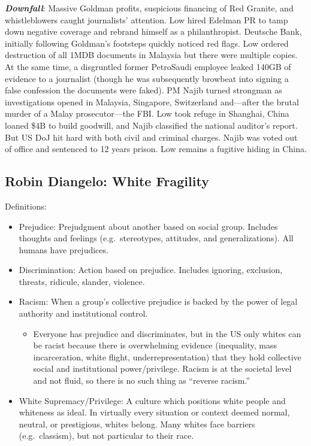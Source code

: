 \documentclass[
]{article}
\providecommand{\tightlist}{%
  \setlength{\itemsep}{0pt}\setlength{\parskip}{0pt}}
\begin{document}
\textbf{\emph{Downfall}}: Massive Goldman profits, suspicious financing
of Red Granite, and whistleblowers caught journalists' attention. Low
hired Edelman PR to tamp down negative coverage and rebrand himself as a
philanthropist. Deutsche Bank, initially following Goldman's footsteps
quickly noticed red flags. Low ordered destruction of all 1MDB documents
in Malaysia but there were multiple copies. At the same time, a
disgruntled former PetroSaudi employee leaked 140GB of evidence to a
journalist (though he was subsequently browbeat into signing a false
confession the documents were faked). PM Najib turned strongman as
investigations opened in Malaysia, Singapore, Switzerland and---after
the brutal murder of a Malay prosecutor---the FBI. Low took refuge in
Shanghai, China loaned \$4B to build goodwill, and Najib classified the
national auditor's report. But US DoJ hit hard with both civil and
criminal charges. Najib was voted out of office and sentenced to 12
years prison. Low remains a fugitive hiding in China.

\hypertarget{robin-diangelo-white-fragility}{%
\subsection{Robin Diangelo: White
Fragility}\label{robin-diangelo-white-fragility}}

Definitions:

\begin{itemize}
\item
  Prejudice: Prejudgment about another based on social group. Includes
  thoughts and feelings (e.g.~stereotypes, attitudes, and
  generalizations). All humans have prejudices.
\item
  Discrimination: Action based on prejudice. Includes ignoring,
  exclusion, threats, ridicule, slander, violence.
\item
  Racism: When a group's collective prejudice is backed by the power of
  legal authority and institutional control.

  \begin{itemize}
  \tightlist
  \item
    Everyone has prejudice and discriminates, but in the US only whites
    can be racist because there is overwhelming evidence (inequality,
    mass incarceration, white flight, underrepresentation) that they
    hold collective social and institutional power/privilege. Racism is
    at the societal level and not fluid, so there is no such thing as
    ``reverse racism.''
  \end{itemize}
\item
  White Supremacy/Privilege: A culture which positions white people and
  whiteness as ideal. In virtually every situation or context deemed
  normal, neutral, or prestigious, whites belong. Many whites face
  barriers (e.g.~classism), but not particular to their race.
\end{itemize}
\end{document}
